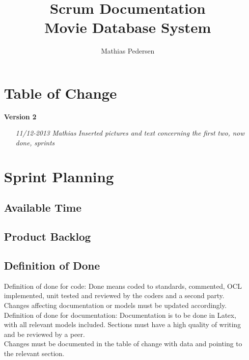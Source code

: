 \documentclass[]{report}
\title{Scrum Documentation \\ Movie Database System}
\author{Mathias Pedersen}
\begin{document}
\maketitle

\chapter*{Table of Change}

\hspace{-2cm}\textbf{Version 2}
 \begin{itemize}
\item[\textit{11/12-2013 Mathias}] \hspace{0.5cm}
\textit{Inserted pictures and text concerning the first two, now done, sprints}


\vspace{0.4cm}

\end{itemize}



\chapter*{Sprint Planning}



\section{Available Time}
\label{sec:Available Time}


\section{Product Backlog}
\label{sec:Product Backlog}



\section{Definition of Done}
\label{sec:Definition of Done}
Definition of done for code:
Done means coded to standards, commented, OCL implemented, unit tested and reviewed by the coders and a second party. Changes affecting documentation or models must be updated accordingly. \\


\noindent Definition of done for documentation:
Documentation is to be done in Latex, with all relevant models included. Sections must have a high quality of writing and be reviewed by a peer. \\
Changes must be documented in the table of change with data and pointing to the relevant section.
\end{document}

